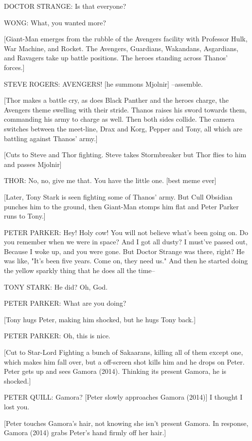 DOCTOR STRANGE: Is that everyone?

WONG: What, you wanted more?

[Giant-Man emerges from the rubble of the Avengers facility with Professor Hulk, War Machine, and Rocket. The Avengers, Guardians, Wakandans, Asgardians, and Ravagers take up battle positions. The heroes standing across Thanos' forces.]

STEVE ROGERS: AVENGERS! [he summons Mjolnir] –assemble.

[Thor makes a battle cry, as does Black Panther and the heroes charge, the Avengers theme swelling with their stride. Thanos raises his sword towards them, commanding his army to charge as well. Then both sides collide. The camera switches between the meet-line, Drax and Korg, Pepper and Tony, all which are battling against Thanos' army.]

[Cuts to Steve and Thor fighting. Steve takes Stormbreaker but Thor flies to him and passes Mjolnir]

THOR: No, no, give me that. You have the little one. [best meme ever]

[Later, Tony Stark is seen fighting some of Thanos' army. But Cull Obsidian punches him to the ground, then Giant-Man stomps him flat and Peter Parker runs to Tony.]

PETER PARKER: Hey! Holy cow! You will not believe what's been going on. Do you remember when we were in space? And I got all dusty? I must've passed out, Because I woke up, and you were gone. But Doctor Strange was there, right? He was like, "It's been five years. Come on, they need us." And then he started doing the yellow sparkly thing that he does all the time–

TONY STARK: He did? Oh, God.

PETER PARKER: What are you doing?

[Tony hugs Peter, making him shocked, but he hugs Tony back.]

PETER PARKER: Oh, this is nice.

[Cut to Star-Lord Fighting a bunch of Sakaarans, killing all of them except one, which makes him fall over, but a off-screen shot kills him and he drops on Peter. Peter gets up and sees Gamora (2014). Thinking its present Gamora, he is shocked.]

PETER QUILL: Gamora? [Peter slowly approaches Gamora (2014)] I thought I lost you.

[Peter touches Gamora's hair, not knowing she isn't present Gamora. In response, Gamora (2014) grabs Peter's hand firmly off her hair.]

